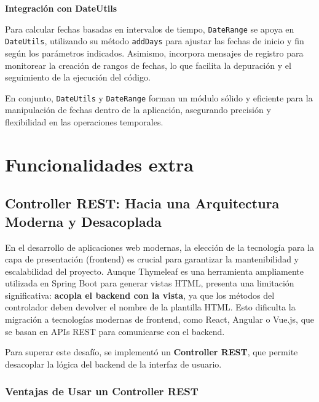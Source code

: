 \documentclass[draft]{scrbook}
\begin{document}
\textbf{Integración con DateUtils}

Para calcular fechas basadas en intervalos de tiempo, \texttt{DateRange} se apoya en \texttt{DateUtils}, utilizando su método \texttt{addDays} para ajustar las fechas de inicio y fin según los parámetros indicados. Asimismo, incorpora mensajes de registro para monitorear la creación de rangos de fechas, lo que facilita la depuración y el seguimiento de la ejecución del código.

En conjunto, \texttt{DateUtils} y \texttt{DateRange} forman un módulo sólido y eficiente para la manipulación de fechas dentro de la aplicación, asegurando precisión y flexibilidad en las operaciones temporales.



\section{ Funcionalidades extra }
\subsection{Controller REST: Hacia una Arquitectura Moderna y Desacoplada}

En el desarrollo de aplicaciones web modernas, la elección de la tecnología para la capa de presentación (frontend) es crucial para garantizar la mantenibilidad y escalabilidad del proyecto. Aunque Thymeleaf es una herramienta ampliamente utilizada en Spring Boot para generar vistas HTML, presenta una limitación significativa: \textbf{acopla el backend con la vista}, ya que los métodos del controlador deben devolver el nombre de la plantilla HTML. Esto dificulta la migración a tecnologías modernas de frontend, como React, Angular o Vue.js, que se basan en APIs REST para comunicarse con el backend.

Para superar este desafío, se implementó un \textbf{Controller REST}, que permite desacoplar la lógica del backend de la interfaz de usuario.

\subsubsection{Ventajas de Usar un Controller REST}
\end{document}
